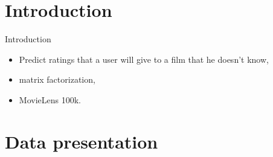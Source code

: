 \documentclass[unknownkeysallowed]{beamer}
\begin{document}


\section{Introduction}
\label{sec:introdcution}

\begin{frame}{Introduction}
\begin{itemize}
    \item Predict ratings that a user will give to a film that he doesn't know,
    \item matrix factorization,
    \item MovieLens 100k.
\end{itemize}
\end{frame}

\section{Data presentation}
\label{sec:data}
\end{document}
